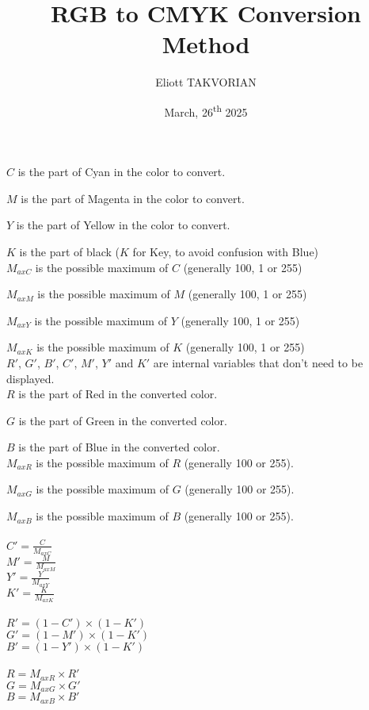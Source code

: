 \documentclass{article}
\title{RGB to CMYK Conversion Method}
\author{Eliott TAKVORIAN}
\date{March, 26\textsuperscript{th} 2025}
\begin{document}
	
	\maketitle
	
    $C$ is the part of Cyan in the color to convert.

    $M$ is the part of Magenta in the color to convert.

    $Y$ is the part of Yellow in the color to convert.
    
    $K$ is the part of black ($K$ for Key, to avoid confusion with Blue)\\
    

    $M_{axC}$ is the possible maximum of $C$ (generally 100, 1 or 255)

    $M_{axM}$ is the possible maximum of $M$ (generally 100, 1 or 255)
	
	$M_{axY}$ is the possible maximum of $Y$ (generally 100, 1 or 255)
	
    $M_{axK}$ is the possible maximum of $K$ (generally 100, 1 or 255)\\

    $R'$, $G'$, $B'$, $C'$, $M'$, $Y'$ and $K'$ are internal variables that don't need to be displayed.\\

    $R$ is the part of Red in the converted color.

    $G$ is the part of Green in the converted color.

    $B$ is the part of Blue in the converted color.\\
    

    $M_{axR}$ is the possible maximum of $R$ (generally 100 or 255).

    $M_{axG}$ is the possible maximum of $G$ (generally 100 or 255).

    $M_{axB}$ is the possible maximum of $B$ (generally 100 or 255).\\\\


    $C'=\frac{C}{M_{axC}}$\\

    $M'=\frac{M}{M_{axM}}$\\

    $Y'=\frac{Y}{M_{axY}}$\\

    $K'=\frac{K}{M_{axK}}$\\\\
    

    $R'=(1-C')\times(1-K')$\\
    
    $G'=(1-M')\times(1-K')$\\
    
    $B'=(1-Y')\times(1-K')$\\\\
    
    
    $R=M_{axR}\times R'$\\
    
    $G=M_{axG}\times G'$\\
    
    $B=M_{axB}\times B'$\\
        
\end{document}
